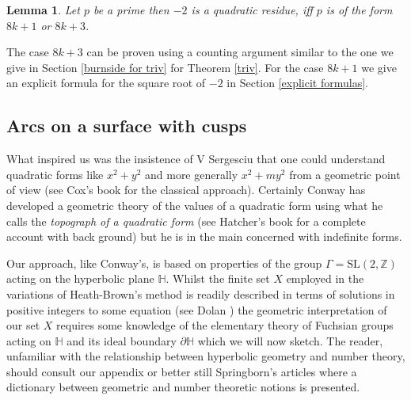 \documentclass[12pt,a4paper]{amsart}
\newtheorem{lem}[thm]{Lemma}
\def\ZZ{\mathbb{Z}}
\def\sl2{\mathrm{SL}(2, \ZZ)}
\begin{document}
\begin{lem}\label{analogue for -2}
Let $p$ be a prime then 
$-2$ is a quadratic residue, 
iff  $p$ is of the form $8k+1$ or $8k+3$.
\end{lem}

The case $8k+3$ can be proven using 
a counting argument similar to the one we give in Section
\ref{burnside for triv}
for Theorem \ref{triv}.
For the case $8k+1$ we give an explicit formula
for the square root of $-2$ in Section \ref{explicit formulas}.




\subsection{Arcs on a surface with cusps}

What inspired us was the insistence of V Sergesciu that one could
understand quadratic forms like $x^2 +y^2$ and more generally $x^2 + my^2$
from a geometric point of view (see Cox's book \cite{cox} for the classical approach).
Certainly Conway \cite{conway} has developed a geometric theory of 
the values of a quadratic form using what he calls the
\textit{topograph of a quadratic form}
(see Hatcher's book \cite{hatcher} for a complete account with back
ground)
but he is in the main concerned with indefinite forms.

Our approach, like Conway's, is based on properties of  the group
$\Gamma=\sl2$ acting on the hyperbolic plane $\mathbb{H}$.
Whilst the finite set $X$ employed in the variations of
Heath-Brown's method is readily described in terms of solutions
in positive integers to some equation (see  Dolan \cite{dolan}) 
the geometric interpretation of our set $X$ requires some knowledge
of the elementary theory of Fuchsian groups acting on $\mathbb{H}$ and
its ideal boundary $\partial \mathbb{H}$ which we will now sketch.
The reader, unfamiliar with the relationship between hyperbolic
geometry and number theory,
should consult our appendix or better still Springborn's articles \cite{springborn1, springborn2}
where a dictionary between geometric and number theoretic notions is presented.
\end{document}
